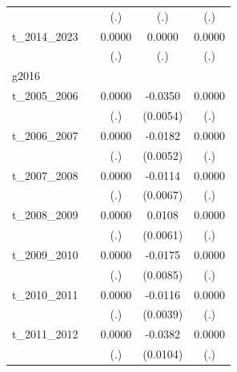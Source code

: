 \begin{table}[htbp]
\begin{tabular}{l*{4}{c}}
            &                     &         (.)         &         (.)         &         (.)         \\
[1em]
t\_2014\_2023 &                     &      0.0000         &      0.0000         &      0.0000         \\
            &                     &         (.)         &         (.)         &         (.)         \\
\hline
g2016       &                     &                     &                     &                     \\
t\_2005\_2006 &                     &      0.0000         &     -0.0350\sym{***}&      0.0000         \\
            &                     &         (.)         &    (0.0054)         &         (.)         \\
[1em]
t\_2006\_2007 &                     &      0.0000         &     -0.0182\sym{***}&      0.0000         \\
            &                     &         (.)         &    (0.0052)         &         (.)         \\
[1em]
t\_2007\_2008 &                     &      0.0000         &     -0.0114\sym{*}  &      0.0000         \\
            &                     &         (.)         &    (0.0067)         &         (.)         \\
[1em]
t\_2008\_2009 &                     &      0.0000         &      0.0108\sym{*}  &      0.0000         \\
            &                     &         (.)         &    (0.0061)         &         (.)         \\
[1em]
t\_2009\_2010 &                     &      0.0000         &     -0.0175\sym{**} &      0.0000         \\
            &                     &         (.)         &    (0.0085)         &         (.)         \\
[1em]
t\_2010\_2011 &                     &      0.0000         &     -0.0116\sym{***}&      0.0000         \\
            &                     &         (.)         &    (0.0039)         &         (.)         \\
[1em]
t\_2011\_2012 &                     &      0.0000         &     -0.0382\sym{***}&      0.0000         \\
            &                     &         (.)         &    (0.0104)         &         (.)         \\

\end{tabular}
\end{table}
